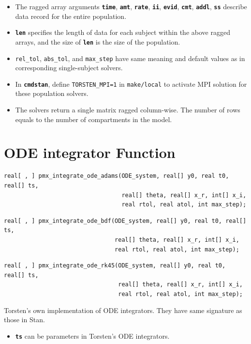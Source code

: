 \documentclass[11pt, reqno, oneside]{amsbook}
\numberwithin{equation}{chapter}
\numberwithin{figure}{chapter}
\numberwithin{table}{chapter}
\theoremstyle{remark}
\begin{document}
\begin{itemize}
\item The ragged array arguments {\small \color{MRGGreen} \texttt{\textbf{time}}}, {\small \color{MRGGreen} \texttt{\textbf{amt}}}, {\small \color{MRGGreen} \texttt{\textbf{rate}}}, {\small \color{MRGGreen} \texttt{\textbf{ii}}},
{\small \color{MRGGreen} \texttt{\textbf{evid}}}, {\small \color{MRGGreen} \texttt{\textbf{cmt}}}, {\small \color{MRGGreen} \texttt{\textbf{addl}}}, {\small \color{MRGGreen} \texttt{\textbf{ss}}} describe data record for the
entire population.
\item {\small \color{MRGGreen} \texttt{\textbf{len}}} specifies the length of data for each subject within
the above ragged arrays, and the size of {\small \color{MRGGreen} \texttt{\textbf{len}}} is the size
of the population.
\item \texttt{rel\_tol}, \texttt{abs\_tol},
and \texttt{max\_step} have same meaning and default values as in
corresponding single-subject solvers.
\item In {\small \color{MRGGreen} \texttt{\textbf{cmdstan}}}, define \texttt{TORSTEN\_MPI=1} in \texttt{make/local} to
activate MPI solution for these population solvers.
\item The solvers return a single matrix ragged column-wise. The
number of rows equals to the number of compartments in the model.
\end{itemize}

\section{ODE  integrator Function}
\label{sec:orgcadf9b2}
\begin{verbatim}
real[ , ] pmx_integrate_ode_adams(ODE_system, real[] y0, real t0, real[] ts,
                                  real[] theta, real[] x_r, int[] x_i,
                                  real rtol, real atol, int max_step);
\end{verbatim}
\begin{verbatim}
real[ , ] pmx_integrate_ode_bdf(ODE_system, real[] y0, real t0, real[] ts,
                                real[] theta, real[] x_r, int[] x_i,
                                real rtol, real atol, int max_step);
\end{verbatim}
\begin{verbatim}
real[ , ] pmx_integrate_ode_rk45(ODE_system, real[] y0, real t0, real[] ts,
                                 real[] theta, real[] x_r, int[] x_i,
                                 real rtol, real atol, int max_step);
\end{verbatim}
Torsten's own implementation of ODE integrators. They have same
signature as those in Stan.
\begin{itemize}
\item {\small \color{MRGGreen} \texttt{\textbf{ts}}} can be parameters in Torsten's ODE integrators.
\end{itemize}
\end{document}
